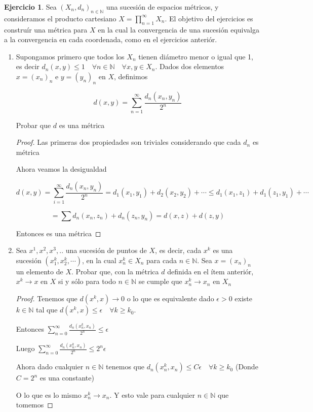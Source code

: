 \documentclass[11pt]{report}
\newcommand{\N}{\mathbb{N}}
\newcommand{\ra}{\rightarrow}
\theoremstyle{definition}
\newtheorem{ej}{Ejercicio}
\begin{document}
\begin{ej}
	Sea $(X_n,d_n)_{n \in \N}$ una sucesión de espacios métricos, y consideramos el producto cartesiano $X = \prod_{n =1}^{\infty} X_n$. El objetivo del ejercicios es construír una métrica para $X$ en la cual la convergencia de una sucesión equivalga a la convergencia en cada coordenada, como en el ejercicios anteriór.
	\begin{enumerate}
		\item Supongamos primero que todos los $X_n$ tienen diámetro menor o igual que 1, es decir $d_n(x,y) \leq 1 \quad \forall n\in \N \quad \forall x,y \in X_n$. Dados dos elementos $x = (x_n)_n$ e $y= (y_n)_n$ en $X$, definimos 

			$$ d(x,y) = \sum_{n = 1}^{\infty} \frac{d_n(x_n,y_n)}{2^n}$$

			Probar que $d$ es una métrica
			\begin{proof}
				Las primeras dos propiedades son triviales considerando que cada $d_n$ es métrica

				Ahora veamos la desigualdad

				$$ d(x,y) = \sum_{i = 1}^\infty \frac{d_n(x_n,y_n)}{2^n} = d_1(x_1,y_1) + d_2(x_2,y_2) + \cdots  \leq d_1(x_1,z_1) + d_1(z_1,y_1) + \cdots $$ 

				$$= \sum d_n(x_n,z_n) + d_n(z_n,y_n) = d(x,z) + d(z,y) $$

				Entonces es una métrica
			\end{proof}
		\item Sea $x^1,x^2,x^3,..$ una sucesión de puntos de $X$, es decir, cada $x^k$ es una sucesión $(x_1^k,x_2^k,\cdots)$, en la cual $x_n^k \in X_n$ para cada $n \in \N$. Sea $x = (x_n)_n$ un elemento de $X$. Probar que, con la métrica $d$ definida en el ítem anteriór, $x^k \ra x $ en $X$ si y sólo para todo $n \in \N$ se cumple que $x_n^k \ra x_n $ en $X_n$	
			
			\begin{proof}
				Tenemos que $d(x^k, x) \ra 0$ o lo que es equivalente dado  $\epsilon > 0 $ existe $k \in \N$ tal que  $d(x^k,x) \leq \epsilon \quad \forall k\geq k_0$. 

			Entonces $\sum_{n = 0}^{\infty} \frac{d_n(x_n^k , x_n)}{2^n} \leq \epsilon $

			Luego  $\sum_{n = 0}^{\infty} \frac{d_n(x_n^k , x_n)}{2^n} \leq 2^n\epsilon $ 

			Ahora dado cualquier $n \in \N$ tenemos que $d_n(x_n^k , x_n) \leq C \epsilon \quad \forall k \geq k_0$ (Donde $C = 2^n$ es una constante)

			O lo que es lo mismo $x_n^k \ra x_n$. Y esto vale para cualquier $n \in \N$ que tomemos
			\end{proof}
			
			
	\end{enumerate}
\end{ej}
\end{document}
